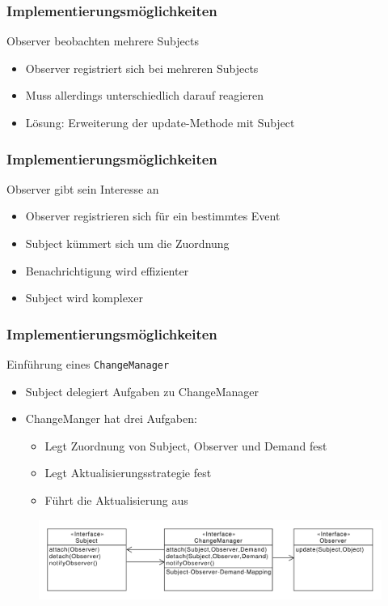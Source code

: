 \begin{frame}
\frametitle{Implementierungsmöglichkeiten}
		  \begin{block}{Observer beobachten mehrere Subjects}
		  	\begin{itemize}
		  		\item Observer registriert sich bei mehreren Subjects
		  		\item Muss allerdings unterschiedlich darauf reagieren
		  		\item Lösung: Erweiterung der update-Methode mit Subject
		  	\end{itemize}
		  \end{block}
\end{frame}

\begin{frame}
\frametitle{Implementierungsmöglichkeiten}
		\begin{block}{Observer gibt sein Interesse an}
  		 \begin{itemize}
		  	\item Observer registrieren sich für ein bestimmtes Event
		  	\item Subject kümmert sich um die Zuordnung
		  	\item Benachrichtigung wird effizienter
		  	\item Subject wird komplexer
		  \end{itemize}  
  		\end{block}		
\end{frame}

\begin{frame}
\frametitle{Implementierungsmöglichkeiten}
		\begin{block}{Einführung eines \texttt{ChangeManager}}
  		 \begin{itemize}
		  	\item Subject delegiert Aufgaben zu ChangeManager
		  	\item ChangeManger hat drei Aufgaben:
		  	\begin{itemize}
		  		\item Legt Zuordnung von Subject, Observer und Demand fest
		  		\item Legt Aktualisierungsstrategie fest
		  		\item Führt die Aktualisierung aus
		  	\end{itemize}
		  \end{itemize}  
  		\end{block}		
  		\begin{figure}
		\includegraphics[scale=.4]{paper/observer/changemanager}
	\end{figure}
\end{frame}

